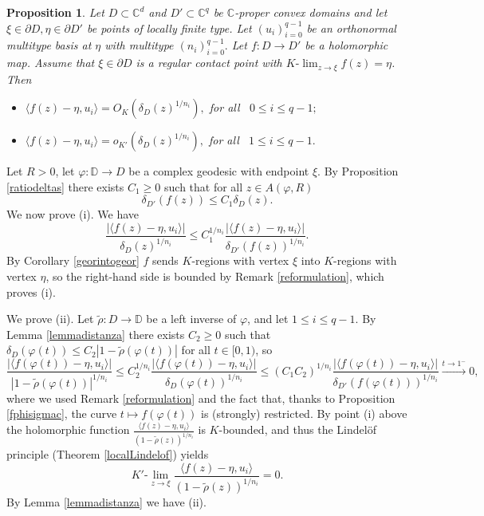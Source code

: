 \documentclass[11pt, reqno]{amsart}
\numberwithin{equation}{section}
\newtheorem{proposition}[theorem]{Proposition}
\theoremstyle{definition}
\newcommand{\C}{\mathbb{C}}
\newcommand{\D}{\mathbb{D}}
\begin{document}
{{{		\begin{proposition}\label{fmenopifn} 
			Let $D\subset\C^d$ and $D'\subset\C^{q}$ be  $\C$-proper convex domains  and  let $\xi\in \partial D,\eta\in \partial D' $ be  points of locally finite type. Let
			$(u_i)_{i=0}^{q-1}$ be an orthonormal multitype basis at $\eta$ with multitype $(n_i)_{i=0}^{q-1}.$ Let  $f\colon D\to D'$ be a holomorphic map. 
			Assume that $\xi\in\partial D$ is a regular contact point with $K\textrm{-}\lim_{z\to\xi}f(z)=\eta$. Then
			\begin{itemize}
				\item[(i)] 
				$\langle f(z)-\eta,u_i\rangle=O_K(\delta_{D}(z)^{1/n_i}),$ for all \, $0\leq i\leq q-1;$
				\item[(ii)]
				$\langle f(z)-\eta,u_i\rangle= o_{K'}(\delta_{D}(z)^{1/n_i}),$ for all \, $1\leq i\leq q-1.$
			\end{itemize}
		\end{proposition}
		\proof
		Let $R>0$,  let $\varphi\colon \D\to D$ be a complex geodesic with endpoint $\xi$. By  Proposition \ref{ratiodeltas} there exists $C_1\geq 0$ such that for all $z\in A(\varphi,R)$
		$$\delta_{D'}(f(z))\leq C_1\delta_D(z).$$
		We now prove (i). We have \begin{equation*}\label{eqpi}\frac{|\langle f(z)-\eta,u_i\rangle|}{\delta_{D}(z)^{1/n_i}}\leq C_1^{1/n_i}\frac{|\langle f(z)-\eta,u_i\rangle|}{\delta_{D'}(f(z))^{1/n_i}}.\end{equation*}
		By Corollary \ref{georintogeor} $f$ sends $K$-regions with vertex $\xi$ into $K$-regions with vertex $\eta$, so the right-hand side is bounded by Remark \ref{reformulation}, which proves (i).
		
		We  prove (ii).    Let $\tilde \rho\colon D\to \D$ be a left inverse of $\varphi$, and let $1\leq i\leq q-1.$
		By Lemma \ref{lemmadistanza} there exists $C_2\geq 0$ such that $\delta_D(\varphi(t))\leq C_2|1-\tilde \rho(\varphi(t))|$ for all $t\in [0,1)$, so
		$$\frac{|\langle f(\varphi(t))-\eta,u_i\rangle|}{|1-\tilde{\rho}(\varphi(t))|^{1/n_i}}\leq C_2^{1/n_i}\frac{|\langle f(\varphi(t))-\eta,u_i\rangle|}{\delta_D(\varphi(t))^{1/n_i}}\leq (C_1C_2)^{1/n_i}\frac{|\langle f(\varphi(t))-\eta,u_i\rangle|}{\delta_{D'}(f(\varphi(t)))^{1/n_i}}\stackrel{t\to 1^-}\longrightarrow 0,$$
		where we used Remark \ref{reformulation} and the fact that, thanks to  Proposition \ref{fphisigmac}, the curve $t\mapsto f(\varphi(t))$ is (strongly) restricted.
		By point (i) above the holomorphic  function $\frac{\langle f(z)-\eta,u_i\rangle}{(1-\tilde{\rho}(z))^{1/n_i}}$ is $K$-bounded, and thus the 
		Lindel\"of principle (Theorem \ref{localLindelof}) yields
		$$K'\textrm{-}\lim_{z\to\xi}\frac{\langle f(z)-\eta,u_i\rangle}{(1-\tilde{\rho}(z))^{1/n_i}}=0.$$
		By Lemma \ref{lemmadistanza} we have (ii).
		\endproof
		
}}}
\end{document}
